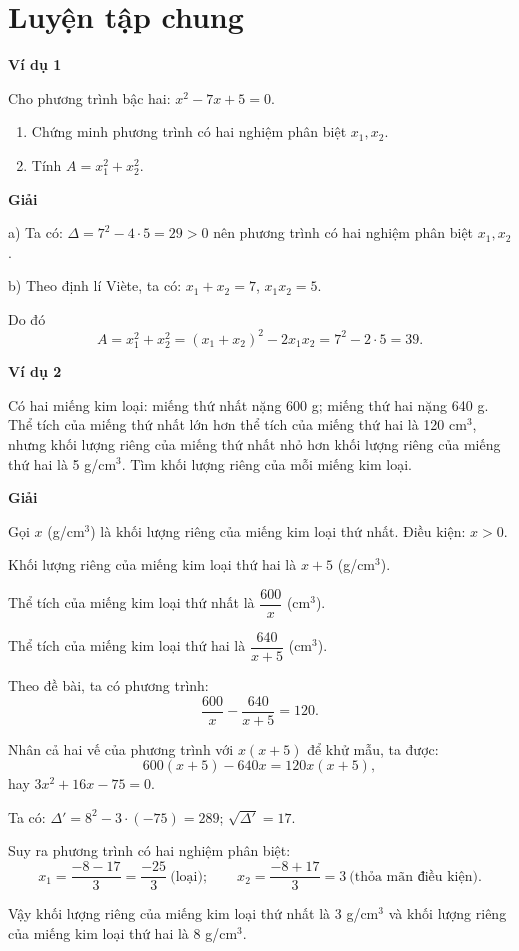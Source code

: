 
\section*{Luyện tập chung}

\begin{lesson}
    \textbf{Ví dụ 1}

    Cho phương trình bậc hai: $x^2-7x+5=0$.
    \begin{enumerate}[label=\alph*)]
        \item Chứng minh phương trình có hai nghiệm phân biệt $x_1,x_2$.
        \item Tính $A=x_1^2+x_2^2$.
    \end{enumerate}

    \textbf{Giải}

    a) Ta có: $\Delta=7^2-4\cdot 5=29>0$ nên phương trình có hai nghiệm phân biệt $x_1,x_2$.

    b) Theo định lí Viète, ta có: $x_1+x_2=7$, $x_1x_2=5$.

    Do đó
    \[
        A=x_1^2+x_2^2=(x_1+x_2)^2-2x_1x_2=7^2-2\cdot 5=39.
    \]

    \textbf{Ví dụ 2}

    Có hai miếng kim loại: miếng thứ nhất nặng 600 g; miếng thứ hai nặng 640 g. Thể tích của miếng thứ nhất lớn hơn thể tích của miếng thứ hai là 120 cm$^3$, nhưng khối lượng riêng của miếng thứ nhất nhỏ hơn khối lượng riêng của miếng thứ hai là 5 g/cm$^3$. Tìm khối lượng riêng của mỗi miếng kim loại.

    \textbf{Giải}

    Gọi $x$ (g/cm$^3$) là khối lượng riêng của miếng kim loại thứ nhất. Điều kiện: $x>0$.

    Khối lượng riêng của miếng kim loại thứ hai là $x+5$ (g/cm$^3$).

    Thể tích của miếng kim loại thứ nhất là $\dfrac{600}{x}$ (cm$^3$).

    Thể tích của miếng kim loại thứ hai là $\dfrac{640}{x+5}$ (cm$^3$).

    Theo đề bài, ta có phương trình:
    \[
        \dfrac{600}{x}-\dfrac{640}{x+5}=120.
    \]

    Nhân cả hai vế của phương trình với $x(x+5)$ để khử mẫu, ta được:
    \[
        600(x+5)-640x=120x(x+5),
    \]
    hay $3x^2+16x-75=0$.

    Ta có: $\Delta'=8^2-3\cdot(-75)=289$; $\sqrt{\Delta'}=17$.

    Suy ra phương trình có hai nghiệm phân biệt:
    \[
        x_1=\dfrac{-8-17}{3}=\dfrac{-25}{3}\ \text{(loại)};
        \qquad
        x_2=\dfrac{-8+17}{3}=3\ \text{(thỏa mãn điều kiện)}.
    \]

    Vậy khối lượng riêng của miếng kim loại thứ nhất là 3 g/cm$^3$ và khối lượng riêng của miếng kim loại thứ hai là 8 g/cm$^3$.
\end{lesson}

